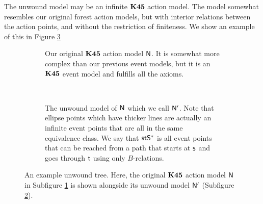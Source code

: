 The unwound model may be an infinite $\bf K45$ action model.
The model somewhat resembles our original forest action models,
but with interior relations between the action points, and without the
restriction of finiteness.
We show an example of this in Figure \ref{generatedTreeExample}

\begin{figure}
\centering
\begin{subfigure}[b]{.45\textwidth}
\centering
{}
\caption{Our original $\bf K45$ action model $\mathrm{\mathsf{N}}$.
It is somewhat more complex than our previous event models, but it is an $\bf K45$ event model and
fulfills all the axioms.}
\label{originalActionModel}
\end{subfigure}
~
\begin{subfigure}[b]{.45\textwidth}
\centering
{}
\caption{The unwound model of $\mathrm{\mathsf{N}}$ which we call $\mathrm{\mathsf{N}}'$. Note that ellipse points which
have thicker lines are actually an infinite event points that are all in the same equivalence class.
We say that $\mathrm{\mathsf{s}} \mathrm{\mathsf{t}} \mathrm{\mathsf{S}}^\ast$ is all event points that can be reached from a path that starts at $\mathrm{\mathsf{s}}$ and
goes through $\mathrm{\mathsf{t}}$ using only $B$-relations.}
\label{unwoundActionModel}
\end{subfigure}
\caption[Example of unwound tree]{An example unwound tree. Here, the original $\bf K45$ action model
$\mathrm{\mathsf{N}}$ in Subfigure \ref{originalActionModel} is shown alongside its unwound model $\mathrm{\mathsf{N}}'$
(Subfigure \ref{unwoundActionModel}). } \label{generatedTreeExample}
\end{figure}

